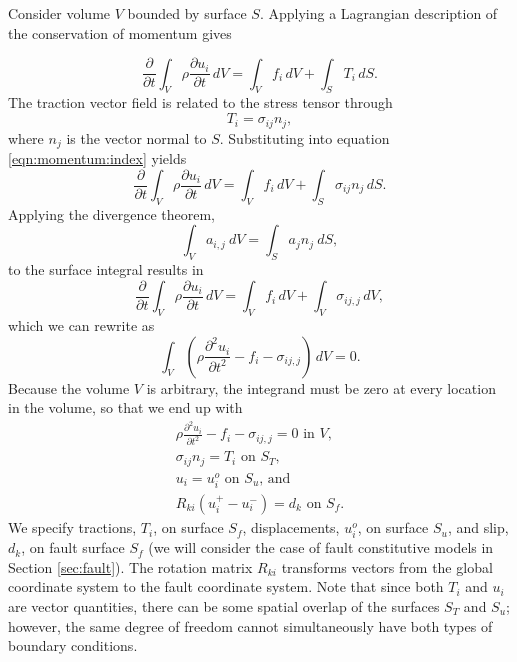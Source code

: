 Consider volume $V$ bounded by surface $S$. Applying a Lagrangian
description of the conservation of momentum gives

\begin{equation}
\frac{\partial}{\partial t}\int_{V}\rho\frac{\partial u_{i}}{\partial t}\, dV=\int_{V}f_{i}\, dV+\int_{S}T_{i}\, dS.\label{eqn:momentum:index}
\end{equation}
The traction vector field is related to the stress tensor through
\begin{equation}
T_{i}=\sigma_{ij}n_{j},
\end{equation}
where $n_{j}$ is the vector normal to $S$. Substituting into equation
\ref{eqn:momentum:index} yields
\begin{equation}
\frac{\partial}{\partial t}\int_{V}\rho\frac{\partial u_{i}}{\partial t}\, dV=\int_{V}f_{i}\, dV+\int_{S}\sigma_{ij}n_{j}\, dS.
\end{equation}
Applying the divergence theorem,
\begin{equation}
\int_{V}a_{i,j}\: dV=\int_{S}a_{j}n_{j}\: dS,
\end{equation}
to the surface integral results in
\begin{equation}
\frac{\partial}{\partial t}\int_{V}\rho\frac{\partial u_{i}}{\partial t}\, dV=\int_{V}f_{i}\, dV+\int_{V}\sigma_{ij,j}\, dV,
\end{equation}
which we can rewrite as
\begin{equation}
\int_{V}\left(\rho\frac{\partial^{2}u_{i}}{\partial t^{2}}-f_{i}-\sigma_{ij,j}\right)\, dV=0.
\end{equation}
Because the volume $V$ is arbitrary, the integrand must be zero at
every location in the volume, so that we end up with
\begin{gather}
\rho\frac{\partial^{2}u_{i}}{\partial t^{2}}-f_{i}-\sigma_{ij,j}=0\text{ in }V,\\
\sigma_{ij}n_{j}=T_{i}\text{ on }S_{T}\text{,}\\
u_{i}=u_{i}^{o}\text{ on }S_{u}\text{, and}\\
R_{ki}(u_{i}^{+}-u_{i}^{-})=d_{k}\text{ on }S_{f}.
\end{gather}
We specify tractions, $T_{i}$, on surface $S_{f}$, displacements,
$u_{i}^{o}$, on surface $S_{u}$, and slip, $d_{k}$, on fault surface
$S_{f}$ (we will consider the case of fault constitutive models in
Section \ref{sec:fault}). The rotation matrix $R_{ki}$ transforms
vectors from the global coordinate system to the fault coordinate
system. Note that since both $T_{i}$ and $u_{i}$ are vector quantities,
there can be some spatial overlap of the surfaces $S_{T}$ and $S_{u}$;
however, the same degree of freedom cannot simultaneously have both
types of boundary conditions.


